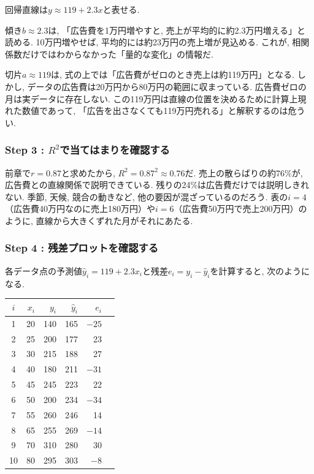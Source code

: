 回帰直線は$y \approx 119 + 2.3x$と表せる.


傾き$b \approx 2.3$は, 「広告費を1万円増やすと, 売上が平均的に約2.3万円増える」と読める.
10万円増やせば, 平均的には約23万円の売上増が見込める.
これが, 相関係数だけではわからなかった「量的な変化」の情報だ.

切片$a \approx 119$は, 式の上では「広告費がゼロのとき売上は約119万円」となる.
しかし, データの広告費は20万円から80万円の範囲に収まっている.
広告費ゼロの月は実データに存在しない.
この119万円は直線の位置を決めるために計算上現れた数値であって, 「広告を出さなくても119万円売れる」と解釈するのは危うい.

\subsubsection*{Step 3 : $R^2$で当てはまりを確認する}

前章で$r = 0.87$と求めたから, $R^2 = 0.87^2 \approx 0.76$だ.
売上の散らばりの約76\%が, 広告費との直線関係で説明できている.
残りの24\%は広告費だけでは説明しきれない.
季節, 天候, 競合の動きなど, 他の要因が混ざっているのだろう.
表の$i = 4$（広告費40万円なのに売上180万円）や$i = 6$（広告費50万円で売上200万円）のように, 直線から大きくずれた月がそれにあたる.

\subsubsection*{Step 4 : 残差プロットを確認する}

各データ点の予測値$\hat{y}_i = 119 + 2.3 x_i$と残差$e_i = y_i - \hat{y}_i$を計算すると, 次のようになる.

\begin{center}
\begin{tabular}{crrrrr}
\hline
$i$ & $x_i$ & $y_i$ & $\hat{y}_i$ & $e_i$ \\
\hline
1 & 20 & 140 & 165 & $-25$ \\
2 & 25 & 200 & 177 & 23 \\
3 & 30 & 215 & 188 & 27 \\
4 & 40 & 180 & 211 & $-31$ \\
5 & 45 & 245 & 223 & 22 \\
6 & 50 & 200 & 234 & $-34$ \\
7 & 55 & 260 & 246 & 14 \\
8 & 65 & 255 & 269 & $-14$ \\
9 & 70 & 310 & 280 & 30 \\
10 & 80 & 295 & 303 & $-8$ \\
\hline
\end{tabular}
\end{center}

